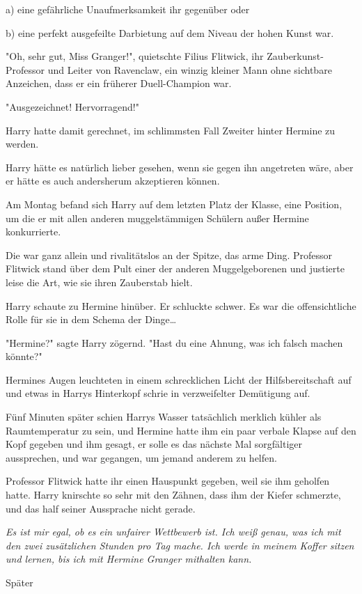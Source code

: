 {a) eine gefährliche Unaufmerksamkeit ihr gegenüber oder

b) eine perfekt ausgefeilte Darbietung auf dem Niveau der hohen Kunst war.

"Oh, sehr gut, Miss Granger!", quietschte Filius Flitwick, ihr Zauberkunst-Professor und Leiter von Ravenclaw, ein winzig kleiner Mann ohne sichtbare Anzeichen, dass er ein früherer Duell-Champion war.

"Ausgezeichnet! Hervorragend!"

Harry hatte damit gerechnet, im schlimmsten Fall Zweiter hinter Hermine zu werden.

Harry hätte es natürlich lieber gesehen, wenn sie gegen ihn angetreten wäre, aber er hätte es auch andersherum akzeptieren können.

Am Montag befand sich Harry auf dem letzten Platz der Klasse, eine Position, um die er mit allen anderen muggelstämmigen Schülern außer Hermine konkurrierte.

Die war ganz allein und rivalitätslos an der Spitze, das arme Ding. Professor Flitwick stand über dem Pult einer der anderen Muggelgeborenen und justierte leise die Art, wie sie ihren Zauberstab hielt.

Harry schaute zu Hermine hinüber. Er schluckte schwer. Es war die offensichtliche Rolle für sie in dem Schema der Dinge…

"Hermine?" sagte Harry zögernd. "Hast du eine Ahnung, was ich falsch machen könnte?"

Hermines Augen leuchteten in einem schrecklichen Licht der Hilfsbereitschaft auf und etwas in Harrys Hinterkopf schrie in verzweifelter Demütigung auf.

Fünf Minuten später schien Harrys Wasser tatsächlich merklich kühler als Raumtemperatur zu sein, und Hermine hatte ihm ein paar verbale Klapse auf den Kopf gegeben und ihm gesagt, er solle es das nächste Mal sorgfältiger aussprechen, und war gegangen, um jemand anderem zu helfen.

Professor Flitwick hatte ihr einen Hauspunkt gegeben, weil sie ihm geholfen hatte. Harry knirschte so sehr mit den Zähnen, dass ihm der Kiefer schmerzte, und das half seiner Aussprache nicht gerade.

\emph{Es ist mir egal, ob es ein unfairer Wettbewerb ist. Ich weiß genau, was ich mit den zwei zusätzlichen Stunden pro Tag mache. Ich werde in meinem Koffer sitzen und lernen, bis ich mit Hermine Granger mithalten kann.}

Später

}

